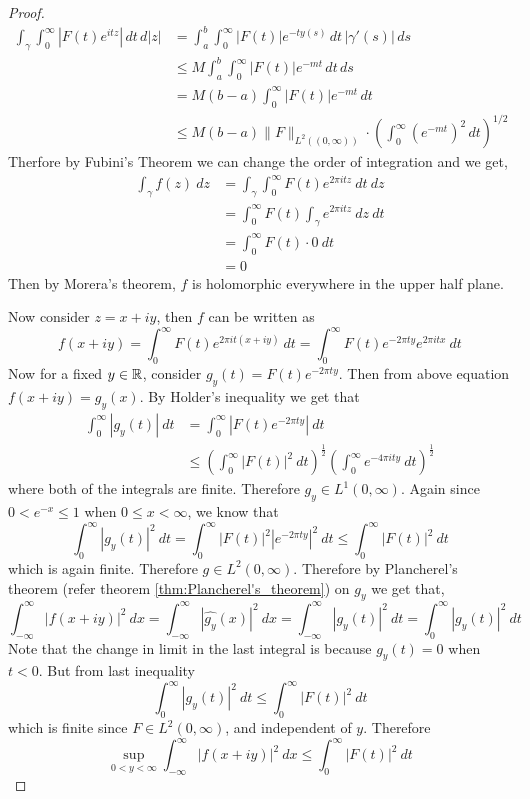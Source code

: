 \begin{proof}
  \begin{align*}
    \int_{\gamma}\int_{0}^{\infty}|F(t)e^{itz}|\,dt\,d|z|&=
    \int_a^b\int_{0}^{\infty}|F(t)|e^{-ty(s)}\,dt\,|\gamma'(s)|\,ds\\
    &\leq M\int_a^b\int_{0}^{\infty}|F(t)|e^{-mt}\,dt\,ds\\
    &=M(b-a)\int_{0}^{\infty}|F(t)|e^{-mt}\,dt\\
    &\leq M(b-a)\|F\|_{L^2((0,\infty))}\cdot\left(\int_{0}^{\infty}(e^{-mt})^2\,dt\right)^{1/2}
  \end{align*}
  Therfore by Fubini's Theorem we can change the order of integration and we get, 
  \begin{align*}
    \int_\gamma f(z)\ dz &= \int_\gamma \int_0^\infty F(t) e^{2\pi i t z} \ dt \ dz \\
    & = \int_0^\infty F(t) \int_\gamma e^{2\pi itz} \ dz \ dt \\
    & = \int_0^\infty F(t) \cdot 0 \ dt \\
    & = 0
  \end{align*}
  Then by Morera's theorem, $f$ is holomorphic everywhere in the upper half plane.

  Now consider $z=x+iy$, then $f$ can be written as $$f(x+iy) = \int_0^\infty F(t)e^{2\pi i t (x+iy)}\ dt = \int_0^\infty F(t)e^{-2\pi ty}e^{2\pi i tx} \ dt$$ 
  Now for a fixed $y \in \mathbb R$, consider $g_y(t) = F(t)e^{-2\pi ty}$. Then from above equation $f(x+iy) = \widehat{g_y}(x)$. By Holder's inequality we get that 
  \begin{align*}
    \int_0^\infty |g_y(t)| \ dt &= \int_0^\infty \left|F(t)e^{-2\pi ty}\right| \ dt \\
    &\le \left(\int_0^\infty \left|F(t)\right|^2 \ dt \right)^{\frac{1}{2}} \left(\int_0^\infty e^{-4\pi ity} \ dt \right)^{\frac{1}{2}}
  \end{align*}
  where both of the integrals are finite. Therefore $g_y \in L^1(0, \infty)$. Again since $0<e^{-x}\le1$ when $0\le x<\infty$, we know that $$\int_0^\infty |g_y(t)|^2 \ dt = \int_0^\infty \left|F(t)\right|^2 \left| e^{-2\pi ty} \right|^2 \ dt \le \int_0^\infty \left|F(t)\right|^2 \ dt$$
  which is again finite. Therefore $g\in L^2(0, \infty)$. Therefore by Plancherel's theorem (refer theorem \ref{thm:Plancherel's_theorem}) on $g_y$ we get that, $$\int_{-\infty}^{\infty}\left|f(x+iy)\right|^2 \ dx = \int_{-\infty}^{\infty} \left|\widehat{g_y}(x)\right|^2 \ dx= \int_{-\infty}^{\infty} \left|g_y(t)\right|^2 \ dt = \int_0^\infty \left|g_y(t)\right|^2 \ dt $$
Note that the change in limit in the last integral is because $g_y(t) = 0$ when $t < 0$. But from last inequality $$\int_0^\infty \left|g_y(t)\right|^2 \ dt \le \int_0^\infty \left|F(t)\right|^2 \ dt$$
  which is finite since $F \in L^2(0, \infty)$, and independent of $y$. Therefore $$\sup_{0<y<\infty} \int_{-\infty}^\infty \left|f(x+iy)\right|^2 \ dx \le \int_0^\infty \left|F(t)\right|^2 \ dt $$
\end{proof}

